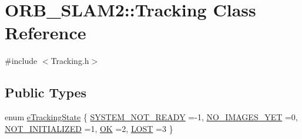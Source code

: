 \hypertarget{class_o_r_b___s_l_a_m2_1_1_tracking}{}\section{O\+R\+B\+\_\+\+S\+L\+A\+M2\+:\+:Tracking Class Reference}
\label{class_o_r_b___s_l_a_m2_1_1_tracking}


{\ttfamily \#include $<$Tracking.\+h$>$}

\subsection*{Public Types}
\begin{DoxyCompactItemize}
\item 
enum \mbox{\hyperlink{class_o_r_b___s_l_a_m2_1_1_tracking_a3995b5e23b910c6ee30b7fe21732fe36}{e\+Tracking\+State}} \{ \newline
\mbox{\hyperlink{class_o_r_b___s_l_a_m2_1_1_tracking_a3995b5e23b910c6ee30b7fe21732fe36a95b60cb653a85df000eb93e0c3f00ea0}{S\+Y\+S\+T\+E\+M\+\_\+\+N\+O\+T\+\_\+\+R\+E\+A\+DY}} =-\/1, 
\mbox{\hyperlink{class_o_r_b___s_l_a_m2_1_1_tracking_a3995b5e23b910c6ee30b7fe21732fe36a3a0bc2ff9eb062e5f00e8f0bac6f9783}{N\+O\+\_\+\+I\+M\+A\+G\+E\+S\+\_\+\+Y\+ET}} =0, 
\mbox{\hyperlink{class_o_r_b___s_l_a_m2_1_1_tracking_a3995b5e23b910c6ee30b7fe21732fe36a063250df8b0588a484883bc986defef7}{N\+O\+T\+\_\+\+I\+N\+I\+T\+I\+A\+L\+I\+Z\+ED}} =1, 
\mbox{\hyperlink{class_o_r_b___s_l_a_m2_1_1_tracking_a3995b5e23b910c6ee30b7fe21732fe36af16e000dbb1927cf7f48e97b5e8e78dd}{OK}} =2, 
\newline
\mbox{\hyperlink{class_o_r_b___s_l_a_m2_1_1_tracking_a3995b5e23b910c6ee30b7fe21732fe36affaf8b66b0b767f1eb2b0214b3f37fb2}{L\+O\+ST}} =3
 \}
\end{DoxyCompactItemize}
